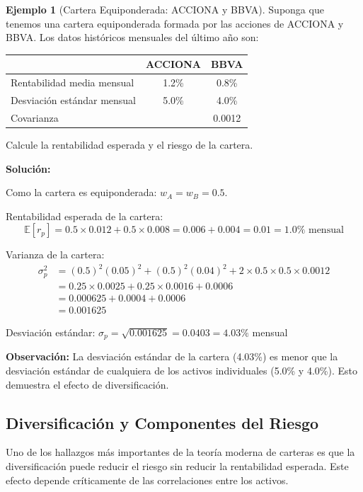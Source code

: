 \documentclass[12pt,a4paper]{article}
\theoremstyle{definition}
\newtheorem{ejemplo}{Ejemplo}[section]
\newcommand{\E}{\mathbb{E}}
\begin{document}
\begin{ejemplo}[Cartera Equiponderada: ACCIONA y BBVA]
Suponga que tenemos una cartera equiponderada formada por las acciones de ACCIONA y BBVA. Los datos históricos mensuales del último año son:

\begin{center}
\begin{tabular}{lcc}
\toprule
& ACCIONA & BBVA \\
\midrule
Rentabilidad media mensual & 1.2\% & 0.8\% \\
Desviación estándar mensual & 5.0\% & 4.0\% \\
Covarianza & & 0.0012 \\
\bottomrule
\end{tabular}
\end{center}

Calcule la rentabilidad esperada y el riesgo de la cartera.

\textbf{Solución:}

Como la cartera es equiponderada: $w_A = w_B = 0.5$.

Rentabilidad esperada de la cartera:
$$\E[r_p] = 0.5 \times 0.012 + 0.5 \times 0.008 = 0.006 + 0.004 = 0.01 = 1.0\% \text{ mensual}$$

Varianza de la cartera:
\begin{align*}
\sigma_p^2 &= (0.5)^2 (0.05)^2 + (0.5)^2 (0.04)^2 + 2 \times 0.5 \times 0.5 \times 0.0012 \\
&= 0.25 \times 0.0025 + 0.25 \times 0.0016 + 0.0006 \\
&= 0.000625 + 0.0004 + 0.0006 \\
&= 0.001625
\end{align*}

Desviación estándar: $\sigma_p = \sqrt{0.001625} = 0.0403 = 4.03\%$ mensual

\textbf{Observación:} La desviación estándar de la cartera (4.03\%) es menor que la desviación estándar de cualquiera de los activos individuales (5.0\% y 4.0\%). Esto demuestra el efecto de diversificación.
\end{ejemplo}

\subsection{Diversificación y Componentes del Riesgo}

Uno de los hallazgos más importantes de la teoría moderna de carteras es que la diversificación puede reducir el riesgo sin reducir la rentabilidad esperada. Este efecto depende críticamente de las correlaciones entre los activos.
\end{document}
